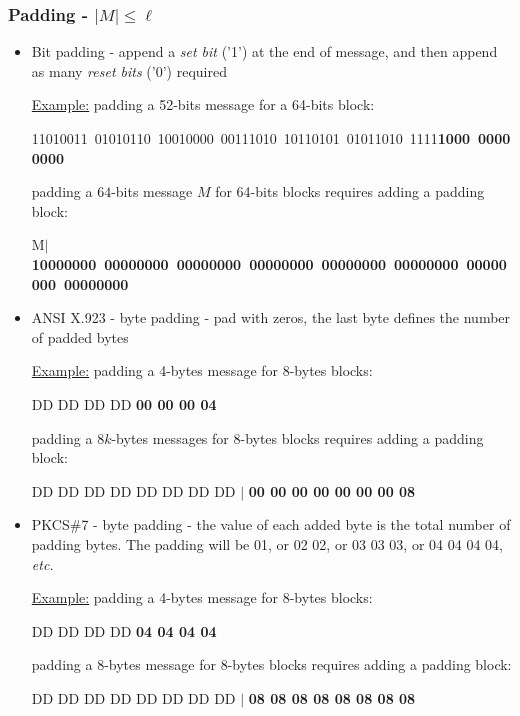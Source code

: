 \documentclass[aspectratio=169, lualatex, handout, 10pt,dvipsnames,svgnames]{beamer} %
\def\envert#1{\textcolor{vert}{#1}}
\def\enbleu#1{\textcolor{bleu}{#1}}
\begin{document}
\begin{frame}
  \frametitle{Padding - $|M| \le \ell$}

  \begin{itemize}
  \item \enbleu{Bit padding -} append a \emph{set bit} ('1') at the end of message, and then append as many \emph{reset bits} ('0') required

    \scriptsize

    \envert{\underline{Example:} padding a 52-bits message for a 64-bits block:}

    \mbox{\envert{11010011 01010110 10010000 00111010 10110101 01011010 1111{\bf 1000 00000000}}}

    \envert{padding a $64$-bits message $M$ for 64-bits blocks requires adding a padding block:}

    \mbox{\envert{M$|${\bf 10000000 00000000 00000000 00000000 00000000 00000000 00000000 00000000}}}
    \medskip{}
    \pause
    \normalsize
    
  \item \enbleu{ANSI X.923 - } byte padding - pad with zeros, the last byte defines the number of padded bytes

    \scriptsize

    \envert{\underline{Example:} padding a 4-bytes message for 8-bytes blocks:}
    
    \envert{DD DD DD DD {\bf 00 00 00 04}}

    \envert{padding a $8k$-bytes messages for 8-bytes blocks requires adding a padding block:}

    \envert{DD DD DD DD DD DD DD DD $|$ {\bf 00 00 00 00 00 00 00 08}}
    \medskip{}
    \pause

    \normalsize
 
  \item \enbleu{PKCS\#7 - } byte padding - the value of each added byte is the total number of padding bytes. The padding will be
    01, or 02 02, or 03 03 03, or 04 04 04 04, \emph{etc.}

    \scriptsize

    \envert{\underline{Example:} padding a 4-bytes message for 8-bytes blocks:}

    \envert{DD DD DD DD {\bf 04 04 04 04}}

    \envert{padding a $8$-bytes message for 8-bytes blocks requires adding a padding block:}

    \envert{DD DD DD DD DD DD DD DD $|$ {\bf 08 08 08 08 08 08 08 08}}

    \normalsize

  \end{itemize}

\end{frame}
\end{document}
